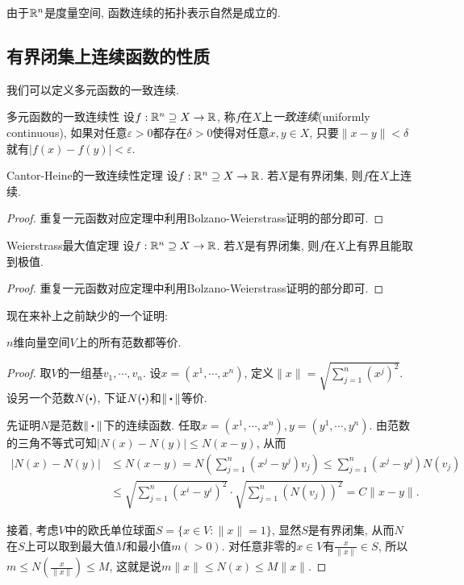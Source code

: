 由于$\mathbb{R} ^n$是度量空间, 函数连续的拓扑表示自然是成立的. 

\subsection{有界闭集上连续函数的性质}

我们可以定义多元函数的一致连续. 

\begin{definition}{多元函数的一致连续性}
	设$f:\mathbb{R} ^n \supseteq X \to \mathbb{R}$, 称$f$在$X$上\textit{一致连续}(uniformly continuous), 如果对任意$\varepsilon >0$都存在$\delta >0$使得对任意$x,y \in X$, 只要$\| x-y \|<\delta$就有$|f(x)-f(y)|<\varepsilon$. 
\end{definition}

\begin{theorem}{Cantor-Heine的一致连续性定理}
	设$f:\mathbb{R} ^n \supseteq X \to \mathbb{R}$. 若$X$是有界闭集, 则$f$在$X$上连续. 
\end{theorem}
\begin{proof}
	重复一元函数对应定理中利用Bolzano-Weierstrass证明的部分即可. 
\end{proof}

\begin{theorem}{Weierstrass最大值定理}
	设$f:\mathbb{R} ^n \supseteq X \to \mathbb{R}$. 若$X$是有界闭集, 则$f$在$X$上有界且能取到极值. 
\end{theorem}
\begin{proof}
	重复一元函数对应定理中利用Bolzano-Weierstrass证明的部分即可. 
\end{proof}

现在来补上之前缺少的一个证明: 

\begin{proposition}{}
	$n$维向量空间$V$上的所有范数都等价. 
\end{proposition}
\begin{proof}
	取$V$的一组基$v_1,\cdots ,v_n$. 设$x=(x^1,\cdots ,x^n)$, 定义$\| x \| = \sqrt{\sum_{j=1}^{n} (x^j)^2}$. 设另一个范数$N(\bigcdot )$, 下证$N(\bigcdot )$和$\| \bigcdot \|$等价. 
	
	先证明$N$是范数$\| \bigcdot \|$下的连续函数. 任取$x=(x^1,\cdots ,x^n),y=(y^1,\cdots ,y^n)$. 由范数的三角不等式可知$|N(x)-N(y)| \leq N(x-y)$, 从而
	\begin{align*}
		|N(x)-N(y)| &\leq N(x-y) = N\left( \sum_{j=1}^{n} (x^j-y^j)v_j \right) \leq \sum_{j=1}^{n} (x^j-y^j)N(v_j) \\
		&\leq \sqrt{\sum_{j=1}^{n} (x^i-y^i)^2} \cdot \sqrt{\sum_{j=1}^{n} (N(v_j))^2} = C\| x-y \|. 
	\end{align*}
	
	接着, 考虑$V$中的欧氏单位球面$S=\{ x \in V:\| x \|=1 \}$, 显然$S$是有界闭集, 从而$N$在$S$上可以取到最大值$M$和最小值$m(>0)$. 对任意非零的$x \in V$有$\frac{x}{\| x \|} \in S$, 所以$m \leq N(\frac{x}{\| x \|}) \leq M$, 这就是说$m\| x \| \leq N(x) \leq M\| x \|$. 
\end{proof}


